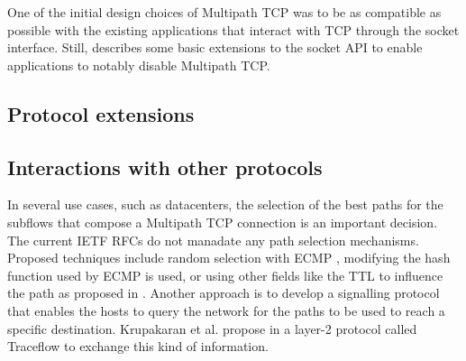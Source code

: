One of the initial design choices of Multipath TCP was to be as compatible as possible with the existing applications that interact with TCP through the socket interface. Still, \cite{rfc6897} describes some basic extensions to the socket API to enable applications to notably disable Multipath TCP.  


\subsection{Protocol extensions}



\subsection{Interactions with other protocols}

In several use cases, such as datacenters, the selection of the best paths for the subflows that compose a Multipath TCP connection is an important decision. The current IETF RFCs do not manadate any path selection mechanisms. Proposed techniques include random selection with ECMP \cite{Raiciu_Datacenter:2011}, modifying the hash function used by ECMP \cite{Detal_Revisiting:2013} is used, or using other fields like the TTL to influence the path as proposed in \cite{Kabbani_Flowbender:2014}. Another approach is to develop a signalling protocol that enables the hosts to query the network for the paths to be used to reach a specific destination. Krupakaran et al. propose in \cite{Krupakaran_Optimized:2015} a layer-2 protocol called Traceflow to exchange this kind of information.

